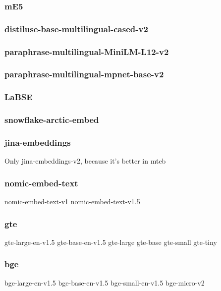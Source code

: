 
\subsubsection{\ac{mE5} \cite{multilingual-e5}}
\subsubsection{distiluse-base-multilingual-cased-v2}
\subsubsection{paraphrase-multilingual-MiniLM-L12-v2}
\subsubsection{paraphrase-multilingual-mpnet-base-v2}
\subsubsection{LaBSE \cite{LaBSE}}



\subsubsection{snowflake-arctic-embed}


\subsubsection{jina-embeddings}
Only jina-embeddings-v2, because it's better in \ac{mteb}


\subsubsection{nomic-embed-text}
nomic-embed-text-v1
nomic-embed-text-v1.5


\subsubsection{gte}

gte-large-en-v1.5
gte-base-en-v1.5
gte-large
gte-base
gte-small
gte-tiny

\subsubsection{bge}

bge-large-en-v1.5
bge-base-en-v1.5
bge-small-en-v1.5
bge-micro-v2


